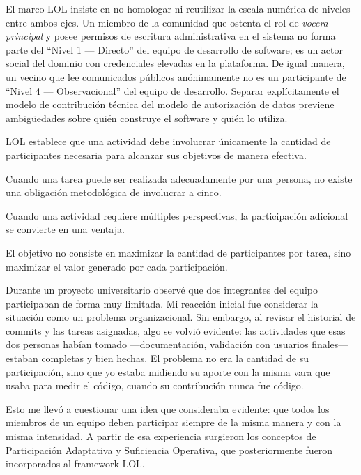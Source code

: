 \documentclass[14pt,a4paper,oneside]{extbook}
\begin{document}
El marco LOL insiste en no homologar ni reutilizar la escala numérica de niveles entre ambos ejes. Un miembro de la comunidad que ostenta el rol de \textit{vocera principal} y posee permisos de escritura administrativa en el sistema no forma parte del \enquote{Nivel 1 — Directo} del equipo de desarrollo de software; es un actor social del dominio con credenciales elevadas en la plataforma. De igual manera, un vecino que lee comunicados públicos anónimamente no es un participante de \enquote{Nivel 4 — Observacional} del equipo de desarrollo. Separar explícitamente el modelo de contribución técnica del modelo de autorización de datos previene ambigüedades sobre quién construye el software y quién lo utiliza.

LOL establece que una actividad debe involucrar únicamente la cantidad de participantes necesaria para alcanzar sus objetivos de manera efectiva.

Cuando una tarea puede ser realizada adecuadamente por una persona, no existe una obligación metodológica de involucrar a cinco.

Cuando una actividad requiere múltiples perspectivas, la participación adicional se convierte en una ventaja.

El objetivo no consiste en maximizar la cantidad de participantes por tarea, sino maximizar el valor generado por cada participación.

\begin{authorobservation}
Durante un proyecto universitario observé que dos integrantes del equipo participaban de forma muy limitada. Mi reacción inicial fue considerar la situación como un problema organizacional. Sin embargo, al revisar el historial de commits y las tareas asignadas, algo se volvió evidente: las actividades que esas dos personas habían tomado —documentación, validación con usuarios finales— estaban completas y bien hechas. El problema no era la cantidad de su participación, sino que yo estaba midiendo su aporte con la misma vara que usaba para medir el código, cuando su contribución nunca fue código.

Esto me llevó a cuestionar una idea que consideraba evidente: que todos los miembros de un equipo deben participar siempre de la misma manera y con la misma intensidad. A partir de esa experiencia surgieron los conceptos de Participación Adaptativa y Suficiencia Operativa, que posteriormente fueron incorporados al framework LOL.
\end{authorobservation}
\end{document}
